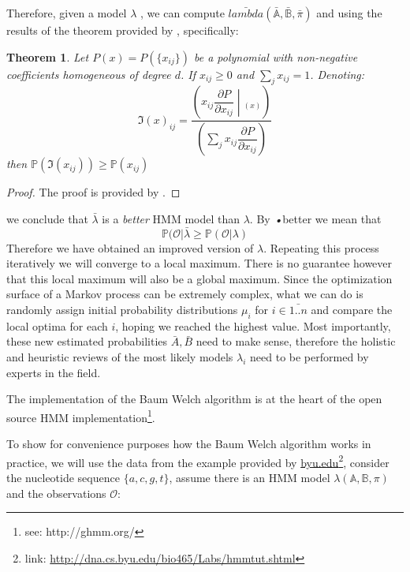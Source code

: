 \documentclass[a4paper,12pt]{article}
\newtheorem{theorem}{Theorem}[section]
\theoremstyle{definition}
\begin{document}
Therefore, given a model $\lambda$ , we can compute $\bar{lambda}(\bar{\mathbb{A}}, \bar{\mathbb{B}}, \bar{\pi})$ and using the results of the theorem provided by \cite{baum1967}, specifically:
\begin{theorem}
Let $P(x) = P (\{x_{ij} \})$ be a polynomial with non-negative coefficients homogeneous of degree $d$. If $x_{ij} \geq 0$ and $\sum_j x_{ij}=1$. Denoting:
\begin{equation}
\mathfrak{I}(x)_{ij}= 
\dfrac{\left( x_{ij} \dfrac{\partial P}{\partial x_{ij}} \middle |_{(x)} \right)}
{\left( \sum_j x_{ij} \dfrac{\partial P}{\partial x_{ij}} \right)  }  
\end{equation}
then $\mathbb{P}(\mathfrak{I}(x_{ij})) \geq \mathbb{P}(x_{ij}) $
\end{theorem}
\begin{proof}
The proof is provided by \cite{baum1967}.
\end{proof}
we conclude that $\bar{\lambda}$ is a \textit{better} HMM model than $\lambda$. By \textit{•}{better} we mean that
\begin{equation}
\mathbb{P}(\mathcal{O}|\bar{\lambda} \geq \mathbb{P}(\mathcal{O}|\lambda)
\end{equation}
Therefore we have obtained an improved version of $\lambda$. Repeating this process iteratively we will converge to a local maximum. There is no guarantee however that this local maximum will also be a global maximum. Since the optimization surface of a Markov process can be extremely complex, what we can do is randomly assign initial probability distributions $\mu_i$ for $i \in \bar{1..n}$ and compare the local optima for each $i$, hoping we reached the highest value. Most importantly, these new estimated probabilities $\bar{A}, \bar{B}$ need to make sense, therefore the holistic and heuristic reviews of the most likely models $\lambda_i$ need to be performed by experts in the field. 

The implementation of the Baum Welch algorithm is at the heart of the open source HMM implementation\footnote{see: http://ghmm.org/}.

To show for convenience purposes how the Baum Welch algorithm works in practice, we will use the data from the example provided by \href{http://dna.cs.byu.edu/bio465/Labs/hmmtut.shtml}{byu.edu}\footnote{link: \href{http://dna.cs.byu.edu/bio465/Labs/hmmtut.shtml}{http://dna.cs.byu.edu/bio465/Labs/hmmtut.shtml}}, consider the nucleotide sequence $\{a, c, g, t\}$, assume there is an HMM model $\lambda(\mathbb{A,B},\pi)$ and the observations $\mathcal{O}$:
\end{document}
